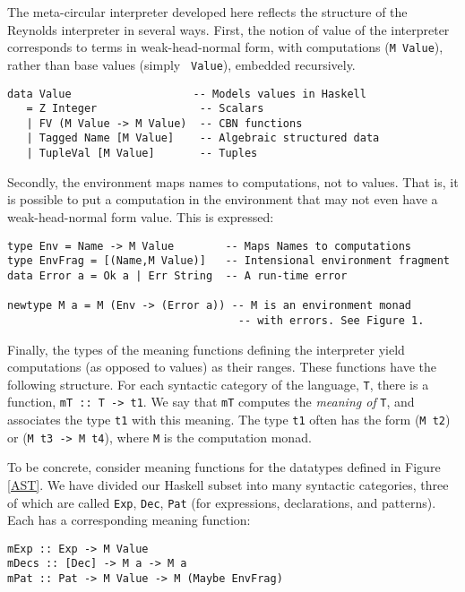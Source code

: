 \documentclass{entcs} \usepackage{entcsmacro}
\begin{document}
The meta-circular interpreter developed here reflects the structure of
the Reynolds interpreter in several ways.  First, the notion of value
of the interpreter corresponds to terms in weak-head-normal form, with
computations ({\tt M Value}), rather than base values (simply {\tt
Value}), embedded recursively.

{\small
\begin{verbatim}
data Value                   -- Models values in Haskell
   = Z Integer                -- Scalars
   | FV (M Value -> M Value)  -- CBN functions
   | Tagged Name [M Value]    -- Algebraic structured data
   | TupleVal [M Value]       -- Tuples
\end{verbatim}
}

Secondly, the environment maps names to computations, not to values.
That is, it is possible to put a computation in the environment that
may not even have a weak-head-normal form value.  This is expressed:

{\small
\begin{verbatim}
type Env = Name -> M Value        -- Maps Names to computations
type EnvFrag = [(Name,M Value)]   -- Intensional environment fragment
data Error a = Ok a | Err String  -- A run-time error

newtype M a = M (Env -> (Error a)) -- M is an environment monad
                                    -- with errors. See Figure 1.
\end{verbatim}
}

Finally, the types of the meaning functions defining the interpreter yield
computations (as opposed to values) as their ranges. These functions have the
following structure. For each syntactic category of the language, {\tt T},
there is a function, {\tt mT :: T -> t1}. We say that {\tt mT} computes the
{\em meaning of} {\tt T}, and associates the type {\tt t1} with this meaning.
The type {\tt t1} often has the form ({\tt M t2}) or ({\tt M t3 -> M t4}),
where {\tt M} is the computation monad.

To be concrete, consider meaning functions for the datatypes defined in
Figure \ref{AST}. We have divided our Haskell subset into many syntactic
categories, three of which are called {\tt Exp}, {\tt Dec}, {\tt Pat} (for
expressions, declarations, and patterns).  Each has a corresponding meaning
function:

{\small
\begin{verbatim}
mExp :: Exp -> M Value
mDecs :: [Dec] -> M a -> M a
mPat :: Pat -> M Value -> M (Maybe EnvFrag)
\end{verbatim}
}
\end{document}

